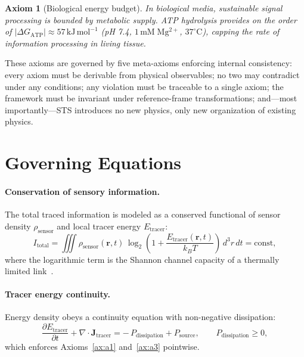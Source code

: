 \documentclass[11pt,a4paper]{article}
\newtheorem{axiom}{Axiom}[section]
\begin{document}
\begin{axiom}[Biological energy budget]\label{ax:a5}
In biological media, sustainable signal processing is bounded by metabolic supply.
ATP hydrolysis provides on the order of $|\Delta G_\mathrm{ATP}|\approx
57\,\mathrm{kJ\,mol^{-1}}$ (pH 7.4, $1\,\mathrm{mM\;Mg^{2+}}$,
$37^{\circ}\mathrm{C}$), capping the rate of information processing in living
tissue.
\end{axiom}

These axioms are governed by five meta-axioms enforcing internal consistency:
every axiom must be derivable from physical observables; no two may contradict
under any conditions; any violation must be traceable to a single axiom; the
framework must be invariant under reference-frame transformations; and---most
importantly---STS introduces no new physics, only new organization of existing
physics.

\section{Governing Equations}
\label{sec:equations}

\paragraph{Conservation of sensory information.}
The total traced information is modeled as a conserved functional of sensor
density $\rho_\mathrm{sensor}$ and local tracer energy $E_\mathrm{tracer}$:
\begin{equation}
I_\mathrm{total}
= \iiint \rho_\mathrm{sensor}(\bm{r},t)\,
  \log_2\!\left(1 + \frac{E_\mathrm{tracer}(\bm{r},t)}{k_B T}\right)
  \, d^3r\, dt = \text{const},
\label{eq:info}
\end{equation}
where the logarithmic term is the Shannon channel capacity of a thermally limited
link~\citep{shannon1948mathematical}.

\paragraph{Tracer energy continuity.}
Energy density obeys a continuity equation with non-negative dissipation:
\begin{equation}
\frac{\partial E_\mathrm{tracer}}{\partial t}
+ \nabla\cdot \bm{J}_\mathrm{tracer}
= -\,P_\mathrm{dissipation} + P_\mathrm{source},
\qquad P_\mathrm{dissipation}\ge 0,
\label{eq:continuity}
\end{equation}
which enforces Axioms~\ref{ax:a1} and~\ref{ax:a3} pointwise.
\end{document}

